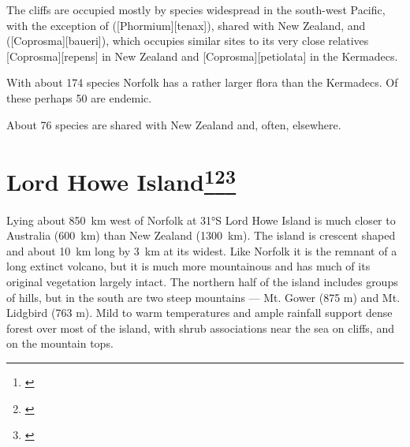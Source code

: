 The cliffs are occupied mostly by species widespread in the south-west Pacific, with the exception of  ([Phormium][tenax]), shared with New Zealand, and  ([Coprosma][baueri]), which occupies similar sites to its very close relatives [Coprosma][repens] in New Zealand and [Coprosma][petiolata] in the Kermadecs.

With about 174 species Norfolk has a rather larger flora than the Kermadecs.
Of these perhaps 50 are endemic.

About 76 species are shared with New Zealand and, often, elsewhere.

\section[Lord Howe Island]{Lord Howe Island\thinspace\footnote{\cite{oliver1896vegetation}}\footnote{\cite{green1979observations}}\footnote{\cite{hutton1986lord}}}

Lying about \SI{850}{\kilo\metre} west of Norfolk at \ang{31}S Lord Howe Island is much closer to Australia (\SI{600}{\kilo\metre}) than New Zealand (\SI{1300}{\kilo\metre}).
The island is crescent shaped and about \SI{10}{\kilo\metre} long by \SI{3}{\kilo\metre} at its widest.
Like Norfolk it is the remnant of a long extinct volcano, but it is much more mountainous and has much of its original vegetation largely intact.
The northern half of the island includes groups of hills, but in the south are two steep mountains --- Mt.
Gower (875 m) and Mt.
Lidgbird (763 m).
Mild to warm temperatures and ample rainfall support dense forest over most of the island, with shrub associations near the sea on cliffs, and on the mountain tops.

